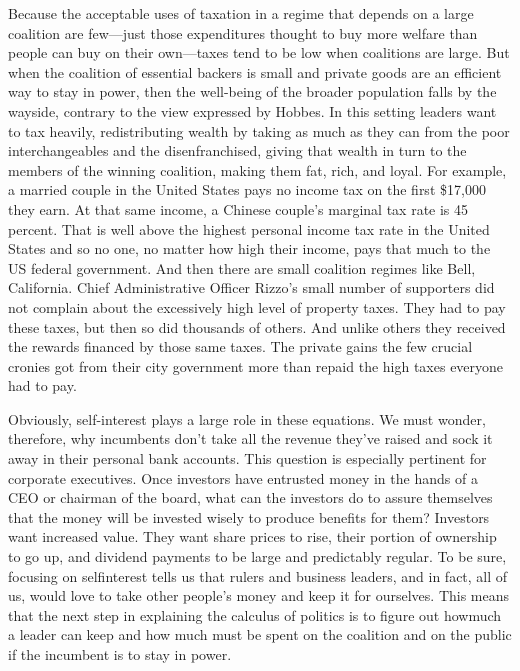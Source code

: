 \documentclass[10pt]{article}
\begin{document}
{\large Because the acceptable uses of taxation in a regime that depends on a
large coalition are few---just those expenditures thought to buy more welfare
than people can buy on their own---taxes tend to be low when coalitions are
large. But when the coalition of essential backers is small and private goods are
an efficient way to stay in power, then the well-being of the broader population
falls by the wayside, contrary to the view expressed by Hobbes. In this setting
leaders want to tax heavily, redistributing wealth by taking as much as they can
from the poor interchangeables and the disenfranchised, giving that wealth in
turn to the members of the winning coalition, making them fat, rich, and loyal.
For example, a married couple in the United States pays no income tax on the
first \$17,000 they earn. At that same income, a Chinese couple's marginal tax
rate is 45 percent. That is well above the highest personal income tax rate in
the United States and so no one, no matter how high their income, pays that much
to the US federal government. And then there are small coalition regimes like
Bell, California. Chief Administrative Officer Rizzo's small number of supporters
did not complain about the excessively high level of property taxes. They had to
pay these taxes, but then so did thousands of others. And unlike others they
received the rewards financed by those same taxes. The private gains the few
crucial cronies got from their city government more than repaid the high taxes
everyone had to pay.}

{\large Obviously, self-interest plays a large role in these equations. We must
wonder, therefore, why incumbents don't take all the revenue they've raised and
sock it away in their personal bank accounts. This question is especially
pertinent for corporate executives. Once investors have entrusted money in the
hands of a CEO or chairman of the board, what can the investors do to assure
themselves that the money will be invested wisely to produce benefits for them?
Investors want increased value. They want share prices to rise, their portion of
ownership to go up, and dividend payments to be large and predictably regular. To
be sure, focusing on selfinterest tells us that rulers and business leaders, and
in fact, all of us, would love to take other people's money and keep it for
ourselves. This means that the next step in explaining the calculus of politics
is to figure out howmuch a leader can keep and how much must be spent on the
coalition and on the public if the incumbent is to stay in power.}
\end{document}
